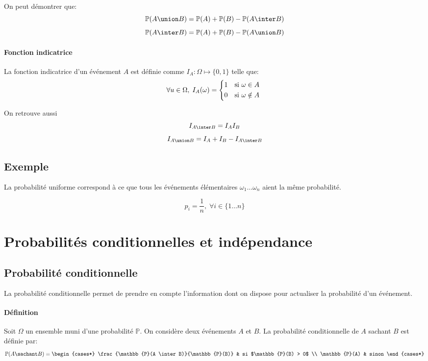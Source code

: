 \documentclass[a4paper,10pt,french,openany]{memoir}
\newcommand{\Proba}{\mathbb{P}}
\begin{document}
On peut démontrer que:
\[ \Proba(A \union B) = \Proba(A) + \Proba(B) - \Proba(A \inter B) \]
\[ \Proba(A \inter B) = \Proba(A) + \Proba(B) - \Proba(A \union B) \]

\paragraph{Fonction indicatrice} La fonction indicatrice d'un événement $A$ est définie comme
$ I_A: \Omega \mapsto \lbrace 0, 1 \rbrace $
telle que:
\[
\forall u \in \Omega, \; I_A(\omega) = \begin{cases*}
1 & si $\omega \in A$ \\ 
0 & si $\omega \notin A$
\end{cases*}
\]

On retrouve aussi
\[I_{A \inter B} = I_A I_B\]
\[I_{A \union B} = I_A + I_B - I_{A \inter B}\]

\subsection{Exemple}

La probabilité uniforme correspond à ce que tous les événements élémentaires $\omega_1\dots\omega_n$ aient la même probabilité.

\[ p_i = \frac1n, \; \forall i \in \lbrace 1 \dots n \rbrace \]

\section{Probabilités conditionnelles et indépendance}
\subsection{Probabilité conditionnelle}

La probabilité conditionnelle permet de prendre en compte l'information dont on dispose pour actualiser la probabilité d'un événement.

\paragraph{Définition}
Soit $\Omega$ un ensemble muni d'une probabilité $\Proba$. On considère deux événements $A$ et $B$. La probabilité conditionnelle de $A$ sachant $B$ est définie par:
\[
\Proba(A \sachant B) =
    \begin{cases*}
        \frac{\Proba(A \inter B)}{\Proba(B)} & si $\Proba(B) > 0$ \\
        \Proba(A) & sinon
    \end{cases*}
\]
\end{document}
